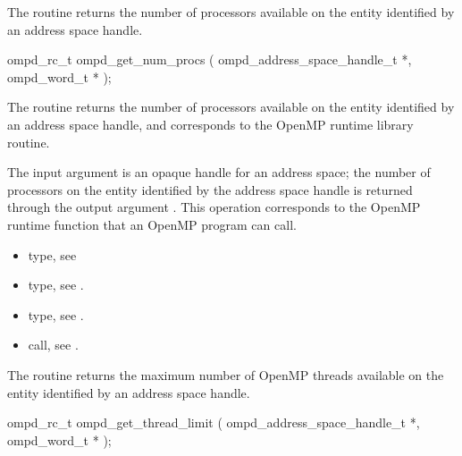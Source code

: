 \label{subsubsubsec:ompd_get_num_procs}
\summary
The  routine returns the number of processors
available on the entity identified by an address space handle.

\format

\begin{cspecific}
\begin{ompSyntax}
ompd_rc_t ompd_get_num_procs (
  ompd_address_space_handle_t *,
  ompd_word_t *
);
\end{ompSyntax}
\end{cspecific}


\descr
The  routine returns the number of processors
available on the entity identified by an address space handle, and corresponds to the
 OpenMP runtime library routine.

\argdesc
The input argument  is an opaque handle for an address space;
the number of processors on the entity identified by the address space
handle is returned through the output argument .
This operation corresponds to the OpenMP runtime function
 that an OpenMP program can call.

\crossreferences
\begin{itemize}
  \item {} type, see 
	\item {} type, see .
	\item {} type, see .
	\item {} call, see .
\end{itemize}

\label{subsubsubsec:ompd_get_thread_limit}
\summary
The  routine returns the maximum
number of OpenMP threads available on the entity identified by
an address space handle.

\format

\begin{cspecific}
\begin{ompSyntax}
ompd_rc_t ompd_get_thread_limit (
  ompd_address_space_handle_t *,
  ompd_word_t *
);
\end{ompSyntax}
\end{cspecific}


